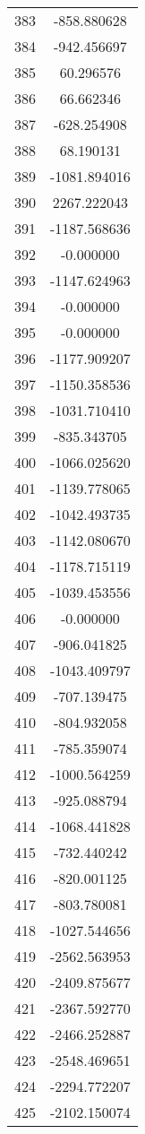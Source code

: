 \documentclass[12pt]{article}
\begin{document}
\begin{longtable}{@{}cc@{}}
383 & -858.880628 \\
384 & -942.456697 \\
385 & 60.296576 \\
386 & 66.662346 \\
387 & -628.254908 \\
388 & 68.190131 \\
389 & -1081.894016 \\
390 & 2267.222043 \\
391 & -1187.568636 \\
392 & -0.000000 \\
393 & -1147.624963 \\
394 & -0.000000 \\
395 & -0.000000 \\
396 & -1177.909207 \\
397 & -1150.358536 \\
398 & -1031.710410 \\
399 & -835.343705 \\
400 & -1066.025620 \\
401 & -1139.778065 \\
402 & -1042.493735 \\
403 & -1142.080670 \\
404 & -1178.715119 \\
405 & -1039.453556 \\
406 & -0.000000 \\
407 & -906.041825 \\
408 & -1043.409797 \\
409 & -707.139475 \\
410 & -804.932058 \\
411 & -785.359074 \\
412 & -1000.564259 \\
413 & -925.088794 \\
414 & -1068.441828 \\
415 & -732.440242 \\
416 & -820.001125 \\
417 & -803.780081 \\
418 & -1027.544656 \\
419 & -2562.563953 \\
420 & -2409.875677 \\
421 & -2367.592770 \\
422 & -2466.252887 \\
423 & -2548.469651 \\
424 & -2294.772207 \\
425 & -2102.150074 \\

\end{longtable}
\end{document}
